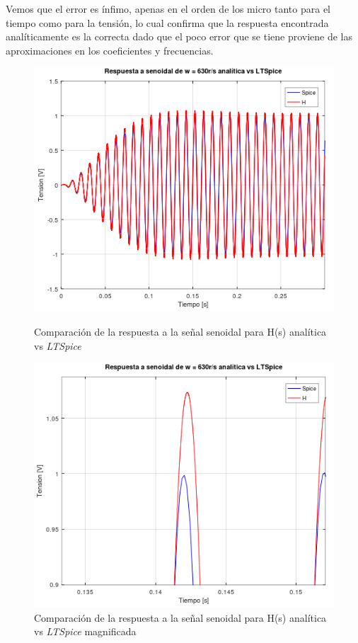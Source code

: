 \documentclass[11pt,a4paper]{report}
\begin{document}
Vemos que el error es ínfimo, apenas en el orden de los micro tanto para el tiempo como para la tensión, lo cual confirma que la respuesta encontrada analíticamente es la correcta dado que el poco error que se tiene proviene de las aproximaciones en los coeficientes y frecuencias.
\clearpage

\begin{figure}[ht!]
\centering
\includegraphics[scale=1]{rtaSenoidalAnaliticavsSpice.png}
\caption{Comparación de la respuesta a la señal senoidal para H(s) analítica vs \textit{LTSpice}}
\includegraphics[scale=0.9]{rtaSenoidalAnaliticavsSpiceMagnificada.png}
\caption{Comparación de la respuesta a la señal senoidal para H(s) analítica vs \textit{LTSpice} magnificada}
\end{figure}
\clearpage
\end{document}
